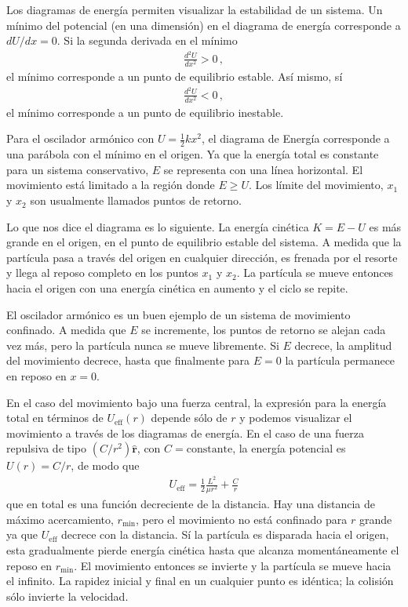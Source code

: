 Los diagramas de energía permiten visualizar la estabilidad de un sistema. Un mínimo del potencial (en una dimensión) en el diagrama de energía corresponde a $dU/dx=0$. Si la segunda derivada en el mínimo
\begin{align}
  \frac{d^2U}{dx^2}>0\,,
\end{align}
el mínimo corresponde a un punto de equilibrio estable. Así mismo, sí
\begin{align}
  \frac{d^2U}{dx^2}<0\,,
\end{align}
el mínimo corresponde a un punto de equilibrio inestable.

Para el oscilador armónico con $U=\frac12 k x^2$, el diagrama de Energía corresponde a una parábola con el mínimo en el origen. Ya que la energía total es constante para un sistema conservativo, $E$ se representa con una línea horizontal. El movimiento está limitado a la región donde $E\ge U$. %
Los límite del movimiento, $x_1$ y $x_2$ %
son usualmente llamados puntos de retorno.

Lo que nos dice el diagrama es lo siguiente. La energía cinética $K=E-U$ es más grande en el origen, en el punto de equilibrio estable del sistema. A medida que la partícula pasa  a través del origen en cualquier dirección, es frenada por el resorte y llega al reposo completo en los puntos $x_1$ y $x_2$. La partícula se mueve entonces hacia el origen con una energía cinética en aumento y el ciclo se repite.

El oscilador armónico es un buen ejemplo de un sistema de movimiento confinado. A medida que $E$ se incremente, los puntos de retorno se alejan cada vez más, pero la partícula nunca se mueve libremente. Si $E$ decrece, la amplitud del movimiento decrece, hasta que finalmente para $E=0$ la partícula permanece en reposo en $x=0$.

En el caso del movimiento bajo una fuerza central, la expresión para la energía total en términos de $U_{\text{eff}}(r)$ depende sólo de $r$ y podemos visualizar el movimiento a través de los diagramas de energía. En el caso de una fuerza repulsiva de tipo $(C/r^2)\hat{\mathbf{r}}$, con $C=\text{constante}$, la energía potencial es $U(r)=C/r$, de modo que
\begin{align}
  U_{\text{eff}}=\frac{1}{2}\frac{L^2}{\mu r^2}+\frac{C}{r} 
\end{align}
que en total es una función decreciente de la distancia. %
Hay una distancia de máximo acercamiento, $r_{\text{min}}$, pero el movimiento no está confinado para $r$ grande ya que $U_{\text{eff}}$ decrece con la distancia. Sí la partícula es disparada hacia el origen, esta gradualmente pierde energía cinética hasta que alcanza momentáneamente el reposo en $r_{\text{min}}$. El movimiento entonces se invierte y la partícula se mueve hacia el infinito. La rapidez inicial y final en un cualquier punto es idéntica; la colisión sólo invierte la velocidad.

